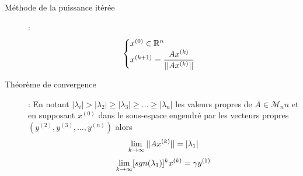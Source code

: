 \begin{description}
\item[Méthode de la puissance itérée] : 
    \[
        \begin{cases}
            x^{(0)} \in\mathbb{R}^n\\
            x^{(k+1)}=\dfrac{Ax^{(k)}}{||Ax^{(k)}||}
        \end{cases}
    \]
\item[Théorème de convergence] : En notant $|\lambda_i|>|\lambda_2|\ge|\lambda_3|\ge\dots\ge|\lambda_n|$ les valeurs propres de $A\in\mathcal M_nn$ et en supposant
    $x^{(0)}$ dans le sous-espace engendré par les vecteurs propres $(y^{(2)},y^{(3)},\dots ,y^{(n)})$ alors
    \[
        \lim_{k\rightarrow\infty} ||Ax^{(k)}|| = |\lambda_1|
    \]
    \[
        \lim_{k\rightarrow\infty} [sgn(\lambda_1)]^kx^{(k)} = \gamma y^{(1)}
    \]
\end{description}